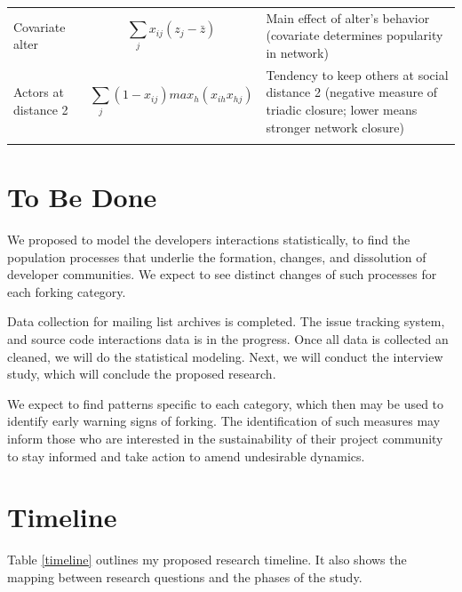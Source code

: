 \documentclass[11pt]{report}
\begin{document}
\begin{table}
\begin{tabular}{m{} m{} m{}}
Covariate alter & \begin{equation*} \sum_j x_{ij} (z_j - \bar z) \end{equation*} & Main effect of alter's behavior (covariate determines popularity in network) \\ 
Actors at distance 2 & \begin{equation*} \sum_j (1 - x_{ij}) max_h (x_{ih}x_{hj}) \end{equation*} & Tendency to keep others at social distance 2 (negative measure of triadic closure; lower means stronger network closure) \\ 
\noalign{\smallskip}
\end{tabular}
\end{table}

\pagebreak

\section{To Be Done}
\label{YetToBeDone}

We proposed to model the developers interactions statistically, to find the population processes that underlie the formation, changes, and dissolution of developer communities. We expect to see distinct changes of such processes for each forking category.

Data collection for mailing list archives is completed. The issue tracking system, and source code interactions data is in the progress. Once all data is collected an cleaned, we will do the statistical modeling. Next, we will conduct the interview study, which will conclude the proposed research. 

We expect to find patterns specific to each category, which then may be used to identify early warning signs of forking. The identification of such measures may inform those who are interested in the sustainability of their project community to stay informed and take action to amend undesirable dynamics. 

\pagebreak

\section{Timeline}
\label{timelineSection}

Table \ref{timeline} outlines my proposed research timeline. It also shows the mapping between research questions and the phases of the study.
\end{document}
